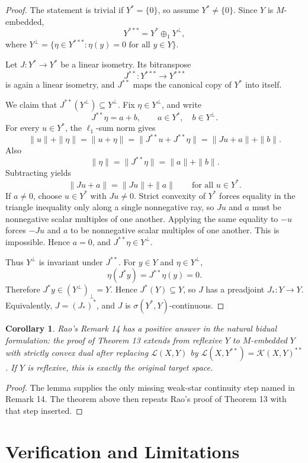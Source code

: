 \documentclass[11pt]{article}
\newtheorem{corollary}{Corollary}
\newcommand{\K}{\mathcal K}
\newcommand{\Lcal}{\mathcal L}
\begin{document}
\begin{proof}
The statement is trivial if \(Y^*=\{0\}\), so assume \(Y^*\neq\{0\}\).
Since \(Y\) is \(M\)-embedded,
\[
Y^{***}=Y^*\oplus_1Y^\perp,
\]
where \(Y^\perp=\{\eta\in Y^{***}:\eta(y)=0\text{ for all }y\in Y\}\).

Let \(J:Y^*\to Y^*\) be a linear isometry. Its bitranspose
\[
J^{**}:Y^{***}\to Y^{***}
\]
is again a linear isometry, and \(J^{**}\) maps the canonical copy of \(Y^*\) into itself.

We claim that \(J^{**}(Y^\perp)\subseteq Y^\perp\). Fix \(\eta\in Y^\perp\), and write
\[
J^{**}\eta=a+b,\qquad a\in Y^*,\quad b\in Y^\perp.
\]
For every \(u\in Y^*\), the \(\ell_1\)-sum norm gives
\[
\|u\|+\|\eta\|
=\|u+\eta\|
=\|J^{**}u+J^{**}\eta\|
=\|Ju+a\|+\|b\|.
\]
Also
\[
\|\eta\|=\|J^{**}\eta\|=\|a\|+\|b\|.
\]
Subtracting yields
\[
\|Ju+a\|=\|Ju\|+\|a\|\qquad\text{for all }u\in Y^*.
\]
If \(a\neq0\), choose \(u\in Y^*\) with \(Ju\neq0\). Strict convexity of \(Y^*\) forces equality in the triangle inequality only along a single nonnegative ray, so \(Ju\) and \(a\) must be nonnegative scalar multiples of one another. Applying the same equality to \(-u\) forces \(-Ju\) and \(a\) to be nonnegative scalar multiples of one another. This is impossible. Hence \(a=0\), and \(J^{**}\eta\in Y^\perp\).

Thus \(Y^\perp\) is invariant under \(J^{**}\). For \(y\in Y\) and \(\eta\in Y^\perp\),
\[
\eta(J^*y)=J^{**}\eta(y)=0.
\]
Therefore \(J^*y\in (Y^\perp)_\perp=Y\). Hence \(J^*(Y)\subseteq Y\), so \(J\) has a preadjoint \(J_*:Y\to Y\). Equivalently, \(J=(J_*)^*\), and \(J\) is \(\sigma(Y^*,Y)\)-continuous.
\end{proof}

\begin{corollary}
Rao's Remark 14 has a positive answer in the natural bidual formulation: the proof of Theorem 13 extends from reflexive \(Y\) to \(M\)-embedded \(Y\) with strictly convex dual after replacing \(\Lcal(X,Y)\) by \(\Lcal(X,Y^{**})=\K(X,Y)^{**}\). If \(Y\) is reflexive, this is exactly the original target space.
\end{corollary}

\begin{proof}
The lemma supplies the only missing weak-star continuity step named in Remark 14. The theorem above then repeats Rao's proof of Theorem 13 with that step inserted.
\end{proof}

\section*{Verification and Limitations}
\end{document}
